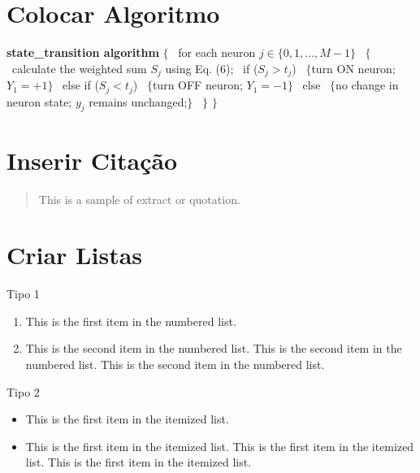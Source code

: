 

\section{Colocar Algoritmo}

\begin{algorithm}
{\bf state\_transition algorithm} $\{$
\        for each neuron $j\in\{0,1,\ldots,M-1\}$
\        $\{$   
\            calculate the weighted sum $S_j$ using Eq. (6);
\            if ($S_j>t_j$)
\                    $\{$turn ON neuron; $Y_1=+1\}$   
\            else if ($S_j<t_j$)
\                    $\{$turn OFF neuron; $Y_1=-1\}$   
\            else
\                    $\{$no change in neuron state; $y_j$ remains %
unchanged;$\}$ 
\        $\}$   
$\}$   
\end{algorithm}

\section{Inserir Citação}

\begin{quote}
	This is a sample of extract or quotation.
\end{quote}


\section{Criar Listas}

Tipo 1 \newline\newline

\begin{enumerate}
\item
This is the first item in the numbered list.

\item
This is the second item in the numbered list.
This is the second item in the numbered list.
This is the second item in the numbered list.
\end{enumerate}

Tipo 2 \newline\newline

\begin{itemize}
\item
This is the first item in the itemized list.

\item
This is the first item in the itemized list.
This is the first item in the itemized list.
This is the first item in the itemized list.
\end{itemize}

